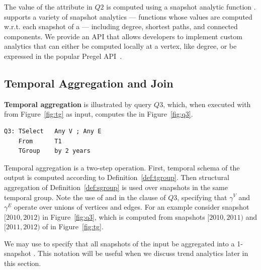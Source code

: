 The value of the attribute  in $Q2$ is computed using a
snapshot analytic function .  \ql supports a variety
of snapshot analytics --- functions whose values are computed
w.r.t. each snapshot of a \tg --- including degree, shortest paths,
and connected components.  We provide an API that allows developers to
implement custom analytics that can either be computed locally at a
vertex, like degree, or be expressed in the popular Pregel
API~\cite{DBLP:conf/sigmod/MalewiczABDHLC10}.

\subsection{Temporal Aggregation and Join}
\label{sec:example:groupjoin}

{\bf Temporal aggregation} is illustrated by query $Q3$, which, when
executed with  from Figure~\ref{fig:tg} as input, computes
the \tg in Figure~\ref{fig:q3}.

\begin{small}
\begin{verbatim}
Q3: TSelect   Any V ; Any E 
    From      T1
    TGroup    by 2 years
\end{verbatim}
\end{small}

Temporal aggregation is a two-step operation.  First, temporal schema
of the output is computed according to Definition~\ref{def:tgroup}.
Then structural aggregation of Definition~\ref{def:sgroup} is used
over snapshots in the same temporal group.  Note the use of  and  in the  clause of $Q3$,
specifying that $\gamma^{V}$ and $\gamma^{E}$ operate over unions of
vertices and edges.  For an example consider snapshot $[2010, 2012)$
  in Figure~\ref{fig:q3}, which is computed from snapshots $[2010,
    2011)$ and $[2011, 2012)$ of  in Figure~\ref{fig:tg}.


We may use  to specify that all snapshots of the
input \tg be aggregated into a 1-snapshot \tg.  This notation will be
useful when we discuss trend analytics later in this section.


